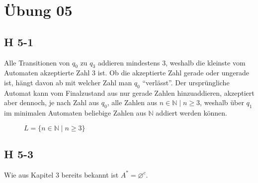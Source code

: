 \documentclass{scrartcl}
\begin{document}
\section{Übung 05}

\subsection{H 5-1}

Alle Transitionen von $q_0$ zu $q_3$ addieren mindestens $3$, weshalb die kleinste vom Automaten akzeptierte Zahl $3$ ist. Ob die akzeptierte Zahl gerade oder ungerade ist, hängt davon ab mit welcher Zahl man $q_0$ \enquote{verlässt}. Der ursprüngliche Automat kann vom Finalzustand aus nur gerade Zahlen hinzuaddieren, akzeptiert aber dennoch, je nach Zahl aus $q_0$, alle Zahlen aus $ n \in \mathbb{N}\;|\;n \geq 3$, weshalb über $q_1$ im minimalen Automaten beliebige Zahlen aus $\mathbb{N}$ addiert werden können.

\begin{figure}[h!]
\centering
{}
\caption*{$L=\{n \in \mathbb{N}\;|\;n \geq 3\}$}
\end{figure}

\subsection{H 5-3}

Wie aus Kapitel 3 bereits bekannt ist $A^* = \varnothing^c$.
\end{document}
